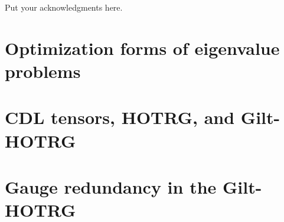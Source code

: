 \documentclass[aps,prb,reprint,superscriptaddress]{revtex4-2}
\begin{document}
\begin{acknowledgments}
Put your acknowledgments here.

\end{acknowledgments}

\appendix
\section{Optimization forms of eigenvalue problems\label{appd:opteig}}

\section{CDL tensors, HOTRG, and Gilt-HOTRG\label{appd:cdlHOTRG}}

\section{Gauge redundancy in the Gilt-HOTRG\label{appd:gaugeFix}}



\end{document}
